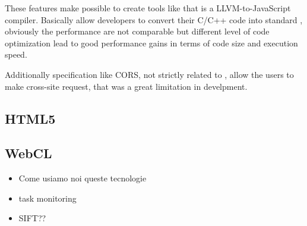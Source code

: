 These features make possible to create tools like  that is a LLVM-to-JavaScript compiler.
Basically allow developers to convert their C/C++ code into standard \js{}, obviously the performance
are not comparable but different level of code optimization lead to good performance gains in terms of
code size and execution speed.

Additionally specification like \ac{CORS}, not strictly related to \js{}, allow the users to make
cross-site request, that was a great limitation in \js{} develpment.

\subsection{HTML5}
\label{sec:bg:web:html5}



\subsection{WebCL}
\label{sec:bg:web:webcl}



\begin{itemize}
	\item Come usiamo noi queste tecnologie
	\item task monitoring
	\item SIFT??
\end{itemize}